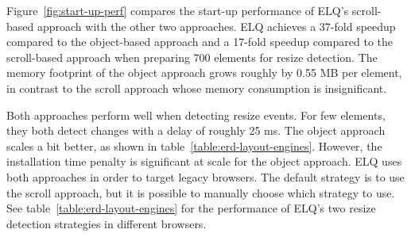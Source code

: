 \documentclass[sigplan,9pt]{acmart}
\newcommand{\elq}{ELQ}
\begin{document}
    Figure~\ref{fig:start-up-perf} compares the start-up performance
    of \elq{}'s scroll-based approach with the other two approaches.
    \elq{} achieves a 37-fold speedup compared to the object-based
    approach and a 17-fold speedup compared to the scroll-based
    approach when preparing 700 elements for resize detection.
    The memory footprint of the object approach grows roughly by 0.55 MB per element, in contrast to the scroll approach whose memory consumption is insignificant.

    Both approaches perform well when detecting resize events. For few elements, they both detect changes with a delay of roughly 25 ms.
    The object approach scales a bit better, as shown in table~\ref{table:erd-layout-engines}. However, the installation time penalty is significant at scale for the object approach.
    \elq{} uses both approaches in order to target legacy browsers. The default strategy is to use the scroll approach, but it is possible to manually choose which strategy to use.
    See table~\ref{table:erd-layout-engines} for the performance of \elq{}'s two resize detection strategies in different browsers.
\end{document}
